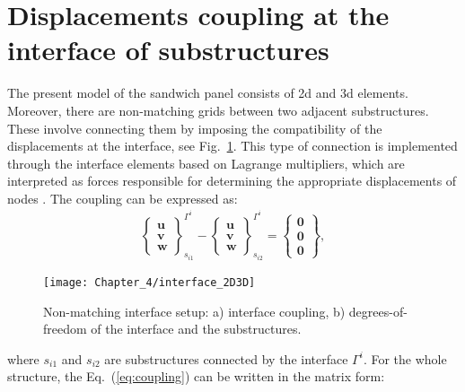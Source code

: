 \section{Displacements coupling at the interface of substructures}
\label{sec:interface}


The present model of the sandwich panel consists of \ac{2d} and \ac{3d} elements. 
Moreover, there are non-matching grids between two adjacent substructures. 
These involve connecting them by imposing the compatibility of the displacements at the interface, see Fig.~\ref{fig:interface}.
This type of connection is implemented through the interface elements based on Lagrange multipliers, which are interpreted as forces responsible for determining the appropriate displacements of nodes \cite{fiborek20192d, fiborek2022spectral}.
The coupling can be expressed as:
\begin{eqnarray}
	\left\{\begin{array}{c}
		\textbf{u}\\
		\textbf{v}\\
		\textbf{w}
	\end{array}\right\}_{s_{i1}}^{\Gamma^i}-
	\left\{\begin{array}{c}
		\textbf{u}\\
		\textbf{v}\\
		\textbf{w}
	\end{array}\right\}_{s_{i2}}^{\Gamma^i}=
	\left\{\begin{array}{c}
		\textbf{0}\\
		\textbf{0}\\
		\textbf{0}
	\end{array}\right\},
	\label{eq:coupling}
\end{eqnarray}
%
\begin{figure}
	\begin{center}
		\texttt{[image: Chapter\_4/interface\_2D3D]}
	\end{center}
	\caption{Non-matching interface setup: a) interface coupling, b) degrees-of-freedom of the interface and the substructures.}
	\label{fig:interface}
\end{figure}
where \(s_{i1}\) and \(s_{i2}\) are substructures connected by the interface \(\Gamma^i\). For the whole structure, the Eq.~(\ref{eq:coupling}) can be written in the matrix form:
